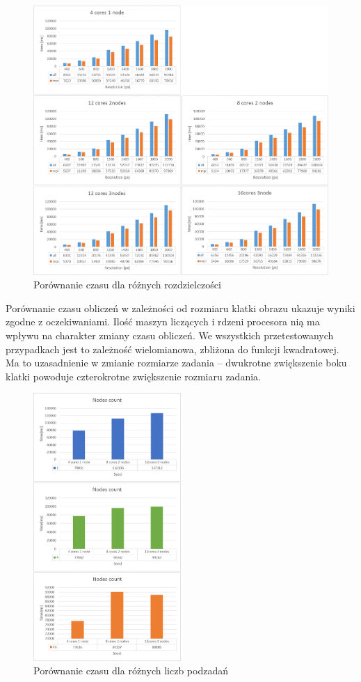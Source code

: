 \documentclass[a4paper]{article}
\begin{document}
\begin{figure}[H]
    \centering
    \includegraphics[width=\textwidth]{2.png}
    \caption{Porównanie czasu dla różnych rozdzielczości}
    \label{fig:w2}
\end{figure}

Porównanie czasu obliczeń w zależności od rozmiaru klatki obrazu ukazuje wyniki zgodne z oczekiwaniami. Ilość maszyn liczących i rdzeni procesora nią ma wpływu na charakter zmiany czasu obliczeń. We wszystkich przetestowanych przypadkach jest to zależność wielomianowa, zbliżona do funkcji kwadratowej. Ma to uzasadnienie w zmianie rozmiarze zadania – dwukrotne zwiększenie boku klatki powoduje czterokrotne zwiększenie rozmiaru zadania.

\begin{figure}[H]
    \centering
    \includegraphics[width=0.5\textwidth]{3.png}
    \caption{Porównanie czasu dla różnych liczb podzadań}
    \label{fig:my_frac}
\end{figure}
\end{document}
